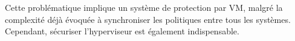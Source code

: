 Cette problématique implique un système de protection par VM, malgré la complexité déjà évoquée à synchroniser les politiques entre tous les systèmes. Cependant, sécuriser l'hyperviseur est également indispensable.




